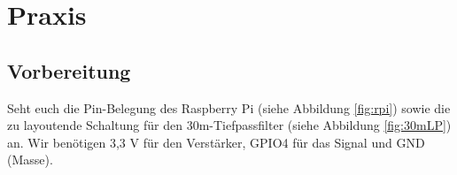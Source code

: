 
\section*{Praxis}

\subsection*{Vorbereitung}

Seht euch die Pin-Belegung des Raspberry Pi (siehe Abbildung \ref{fig:rpi})
sowie die zu layoutende Schaltung für den 30m-Tiefpassfilter (siehe Abbildung
\ref{fig:30mLP}) an. Wir benötigen 3,3 V für den Verstärker, GPIO4 für das
Signal und GND (Masse).

